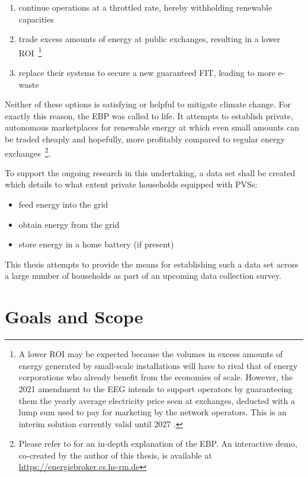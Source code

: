 \begin{enumerate}[label=(\Alph*)]
  \item continue operations at a throttled rate, hereby withholding renewable capacities
  \item trade excess amounts of energy at public exchanges, resulting in a lower \acs{ROI}~\footnote{A lower \acs{ROI} may be expected because the volumes in excess amounts of energy generated by small-scale installations will have to rival that of energy corporations who already benefit from the economies of scale. However, the 2021 amendment to the \acs{EEG} intends to support operators by guaranteeing them the yearly average electricity price seen at exchanges, deducted with a lump sum used to pay for marketing by the network operators. This is an interim solution currently valid until 2027 \cite[§~23b]{eeg2021}.}
  \item replace their systems to secure a new guaranteed \ac{FIT}, leading to more e-waste
\end{enumerate}

Neither of these options is satisfying or helpful to mitigate climate change. For exactly this reason, the \ac{EBP} was called to life. It attempts to establish private, autonomous marketplaces for renewable energy at which even small amounts can be traded cheaply and hopefully, more profitably compared to regular energy exchanges~\footnote{Please refer to \cite{stoy2019broker} for an in-depth explanation of the \ac{EBP}. An interactive demo, co-created by the author of this thesis, is available at \url{https://energiebroker.cs.hs-rm.de}}.

\newpage

To support the ongoing research in this undertaking, a data set shall be created which details to what extent private households equipped with \acsp{PVS}:

\begin{itemize}
  \item feed energy into the grid
  \item obtain energy from the grid
  \item store energy in a home battery (if present)
\end{itemize}

This thesis attempts to provide the means for establishing such a data set across a large number of households as part of an upcoming data collection survey.


\section{Goals and Scope}
\label{sec:goals-and-scope}

